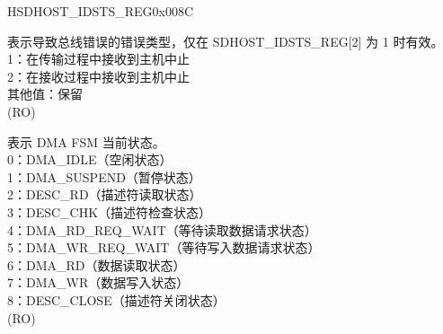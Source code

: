 \addtocounter{Regfloat}{-1}
\begin{register}{H}{SDHOST\_IDSTS\_REG}{0x008C}
\begin{regdesc}\begin{reglist}
\item [接上页...]
\label{fielddesc:SDHOSTIDSTSFBECODE}\item [SDHOST\_IDSTS\_FBE\_CODE] 表示导致总线错误的错误类型，仅在 SDHOST\_IDSTS\_REG[2] 为 1 时有效。\\
1：在传输过程中接收到主机中止\\
2：在接收过程中接收到主机中止\\
其他值：保留\\ (RO)
\label{fielddesc:SDHOSTIDSTSFSM}\item [SDHOST\_IDSTS\_FSM] 表示 DMA FSM 当前状态。\\
0：DMA\_IDLE（空闲状态）\\
1：DMA\_SUSPEND（暂停状态）\\
2：DESC\_RD（描述符读取状态）\\
3：DESC\_CHK（描述符检查状态）\\
4：DMA\_RD\_REQ\_WAIT（等待读取数据请求状态）\\
5：DMA\_WR\_REQ\_WAIT（等待写入数据请求状态）\\
6：DMA\_RD（数据读取状态）\\
7：DMA\_WR（数据写入状态）\\
8：DESC\_CLOSE（描述符关闭状态）\\ (RO)
\end{reglist}\end{regdesc}
\end{register}


